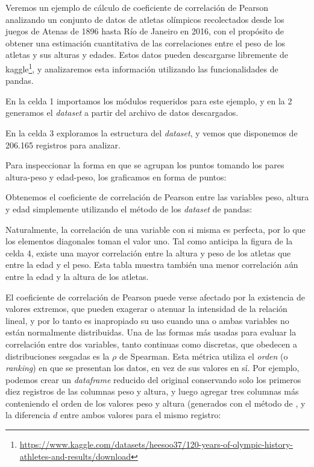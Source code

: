 Veremos un ejemplo de cálculo de coeficiente de correlación de Pearson analizando un conjunto de datos de atletas olímpicos recolectados desde los juegos de Atenas de 1896 hasta Río de Janeiro en 2016, con el propósito de obtener una estimación cuantitativa de las correlaciones entre el peso de los atletas y sus alturas y edades. Estos datos pueden descargarse libremente de kaggle\footnote{\url{https://www.kaggle.com/datasets/heesoo37/120-years-of-olympic-history-athletes-and-results/download}}, y analizaremos esta información utilizando las funcionalidades de pandas.

En la celda 1 importamos los módulos requeridos para este ejemplo, y en la 2 generamos el \textit{dataset} a partir del archivo de datos descargados.



En la celda 3 exploramos la estructura del \textit{dataset}, y vemos que disponemos de 206.165 registros para analizar.


Para inspeccionar la forma en que se agrupan los puntos tomando los pares altura-peso y edad-peso, los graficamos en forma de puntos:


Obtenemos el coeficiente de correlación de Pearson entre las variables peso, altura y edad simplemente utilizando el método  de los \textit{dataset} de pandas:


Naturalmente, la correlación de una variable con si misma es perfecta, por lo que los elementos diagonales toman el valor uno. Tal como anticipa la figura de la celda 4, existe una mayor correlación entre la altura y peso de los atletas que entre la edad y el peso. Esta tabla muestra también una menor correlación aún entre la edad y la altura de los atletas.

El coeficiente de correlación de Pearson puede verse afectado por la existencia de valores extremos, que pueden exagerar o atenuar la intensidad de la relación lineal, y por lo tanto es inapropiado su uso cuando una o ambas variables no están normalmente distribuidas. Una de las formas más usadas para evaluar la correlación entre dos variables, tanto continuas como discretas, que obedecen a distribuciones sesgadas es la $\rho$ de Spearman. Esta métrica utiliza el \textit{orden} (o \textit{ranking}) en que se presentan los datos, en vez de sus valores en sí. Por ejemplo, podemos crear un \textit{dataframe} reducido del original conservando solo los primeros diez registros de las columnas peso y altura, y luego agregar tres columnas más conteniendo el orden de los valores peso y altura (generados con el método  de , y la diferencia $d$ entre ambos valores para el mismo registro:

